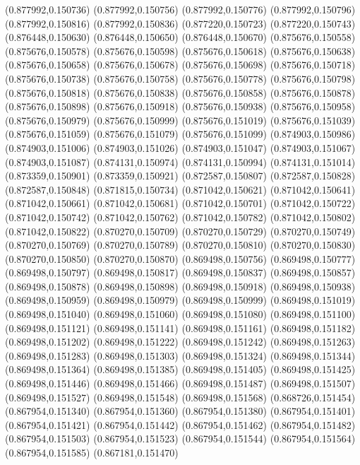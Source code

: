 (0.877992,0.150736)
(0.877992,0.150756)
(0.877992,0.150776)
(0.877992,0.150796)
(0.877992,0.150816)
(0.877992,0.150836)
(0.877220,0.150723)
(0.877220,0.150743)
(0.876448,0.150630)
(0.876448,0.150650)
(0.876448,0.150670)
(0.875676,0.150558)
(0.875676,0.150578)
(0.875676,0.150598)
(0.875676,0.150618)
(0.875676,0.150638)
(0.875676,0.150658)
(0.875676,0.150678)
(0.875676,0.150698)
(0.875676,0.150718)
(0.875676,0.150738)
(0.875676,0.150758)
(0.875676,0.150778)
(0.875676,0.150798)
(0.875676,0.150818)
(0.875676,0.150838)
(0.875676,0.150858)
(0.875676,0.150878)
(0.875676,0.150898)
(0.875676,0.150918)
(0.875676,0.150938)
(0.875676,0.150958)
(0.875676,0.150979)
(0.875676,0.150999)
(0.875676,0.151019)
(0.875676,0.151039)
(0.875676,0.151059)
(0.875676,0.151079)
(0.875676,0.151099)
(0.874903,0.150986)
(0.874903,0.151006)
(0.874903,0.151026)
(0.874903,0.151047)
(0.874903,0.151067)
(0.874903,0.151087)
(0.874131,0.150974)
(0.874131,0.150994)
(0.874131,0.151014)
(0.873359,0.150901)
(0.873359,0.150921)
(0.872587,0.150807)
(0.872587,0.150828)
(0.872587,0.150848)
(0.871815,0.150734)
(0.871042,0.150621)
(0.871042,0.150641)
(0.871042,0.150661)
(0.871042,0.150681)
(0.871042,0.150701)
(0.871042,0.150722)
(0.871042,0.150742)
(0.871042,0.150762)
(0.871042,0.150782)
(0.871042,0.150802)
(0.871042,0.150822)
(0.870270,0.150709)
(0.870270,0.150729)
(0.870270,0.150749)
(0.870270,0.150769)
(0.870270,0.150789)
(0.870270,0.150810)
(0.870270,0.150830)
(0.870270,0.150850)
(0.870270,0.150870)
(0.869498,0.150756)
(0.869498,0.150777)
(0.869498,0.150797)
(0.869498,0.150817)
(0.869498,0.150837)
(0.869498,0.150857)
(0.869498,0.150878)
(0.869498,0.150898)
(0.869498,0.150918)
(0.869498,0.150938)
(0.869498,0.150959)
(0.869498,0.150979)
(0.869498,0.150999)
(0.869498,0.151019)
(0.869498,0.151040)
(0.869498,0.151060)
(0.869498,0.151080)
(0.869498,0.151100)
(0.869498,0.151121)
(0.869498,0.151141)
(0.869498,0.151161)
(0.869498,0.151182)
(0.869498,0.151202)
(0.869498,0.151222)
(0.869498,0.151242)
(0.869498,0.151263)
(0.869498,0.151283)
(0.869498,0.151303)
(0.869498,0.151324)
(0.869498,0.151344)
(0.869498,0.151364)
(0.869498,0.151385)
(0.869498,0.151405)
(0.869498,0.151425)
(0.869498,0.151446)
(0.869498,0.151466)
(0.869498,0.151487)
(0.869498,0.151507)
(0.869498,0.151527)
(0.869498,0.151548)
(0.869498,0.151568)
(0.868726,0.151454)
(0.867954,0.151340)
(0.867954,0.151360)
(0.867954,0.151380)
(0.867954,0.151401)
(0.867954,0.151421)
(0.867954,0.151442)
(0.867954,0.151462)
(0.867954,0.151482)
(0.867954,0.151503)
(0.867954,0.151523)
(0.867954,0.151544)
(0.867954,0.151564)
(0.867954,0.151585)
(0.867181,0.151470)

